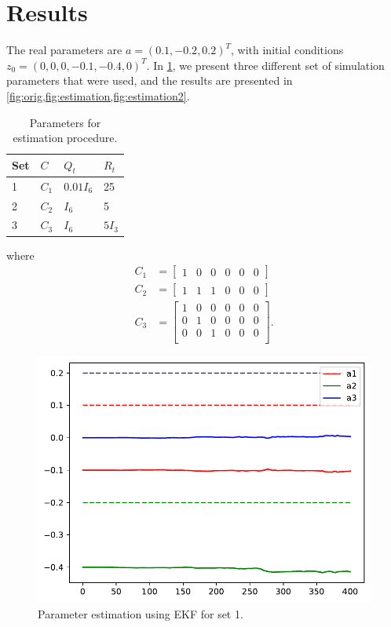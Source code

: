 \section{Results}\label{sec:pre}
The real parameters are $a=(0.1, -0.2, 0.2)^T$, with initial conditions $z_0=(0,0,0,-0.1, -0.4,  0)^T$. In \cref{tab:params}, we present three different set of simulation parameters that were used, and the results are presented in \cref{fig:orig,fig:estimation,fig:estimation2}.


\begin{table}[H]
\centering
\begin{tabular}{llll}
\hline
\textbf{Set} & \textbf{\boldmath$C$} & \textbf{\boldmath$Q_t$} & \textbf{\boldmath$R_t$} \\ \hline
1            & $C_1$                 & $0.01 I_6$        & 25                      \\
2            & $C_2$                 & $I_6$                   & 5                       \\
3            & $C_3$                 & $I_6$                   & $5 I_3$           \\ \hline
\end{tabular}
\caption{Parameters for estimation procedure.}
\label{tab:params}
\end{table}
where
\[
\begin{split}
C_1&=\begin{bmatrix}
  1 & 0 & 0 & 0 & 0 & 0
\end{bmatrix}\\
C_2&=\begin{bmatrix}
  1 & 1 & 1 & 0 & 0 & 0
\end{bmatrix}\\
C_3&=\begin{bmatrix}
  1 & 0 & 0 & 0 & 0 & 0\\
  0 & 1 & 0 & 0 & 0 & 0\\
  0 & 0 & 1 & 0 & 0 & 0\\
\end{bmatrix}.
\end{split}
\]

\begin{figure}
  \centering
  \includegraphics[scale=.4]{files/chinese_original.pdf}
  \caption{Parameter estimation using EKF for set 1.}
  \label{fig:orig}
\end{figure}

